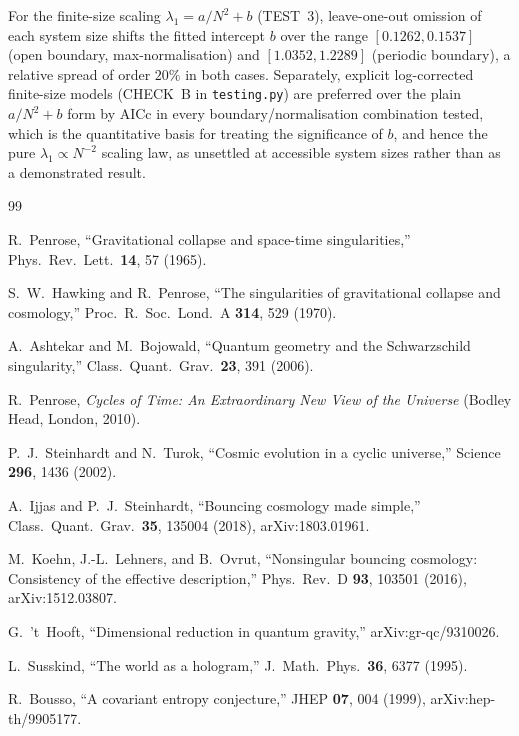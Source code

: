 \documentclass[reprint,superscriptaddress,amsmath,amssymb,aps,prd,showkeys,nofootinbib]{revtex4-2}
\begin{document}
For the finite-size scaling $\lambda_1=a/N^2+b$ (TEST~3), leave-one-out omission of each
system size shifts the fitted intercept $b$ over the range $[0.1262,0.1537]$ (open boundary,
max-normalisation) and $[1.0352,1.2289]$ (periodic boundary), a relative spread of order
$20\%$ in both cases. Separately, explicit log-corrected finite-size models (CHECK~B in
\texttt{testing.py}) are preferred over the plain $a/N^2+b$ form by AICc in every
boundary/normalisation combination tested, which is the quantitative basis for treating the
significance of $b$, and hence the pure $\lambda_1\propto N^{-2}$ scaling law, as unsettled
at accessible system sizes rather than as a demonstrated result.

\begin{thebibliography}{99}

R.~Penrose,
``Gravitational collapse and space-time singularities,''
Phys.\ Rev.\ Lett.\ \textbf{14}, 57 (1965).

S.~W.~Hawking and R.~Penrose,
``The singularities of gravitational collapse and cosmology,''
Proc.\ R.\ Soc.\ Lond.\ A \textbf{314}, 529 (1970).

A.~Ashtekar and M.~Bojowald,
``Quantum geometry and the Schwarzschild singularity,''
Class.\ Quant.\ Grav.\ \textbf{23}, 391 (2006).

R.~Penrose,
\textit{Cycles of Time: An Extraordinary New View of the Universe}
(Bodley Head, London, 2010).

P.~J.~Steinhardt and N.~Turok,
``Cosmic evolution in a cyclic universe,''
Science \textbf{296}, 1436 (2002).

A.~Ijjas and P.~J.~Steinhardt,
``Bouncing cosmology made simple,''
Class.\ Quant.\ Grav.\ \textbf{35}, 135004 (2018),
arXiv:1803.01961.

M.~Koehn, J.-L.~Lehners, and B.~Ovrut,
``Nonsingular bouncing cosmology: Consistency of the effective description,''
Phys.\ Rev.\ D \textbf{93}, 103501 (2016),
arXiv:1512.03807.

G.~'t~Hooft,
``Dimensional reduction in quantum gravity,''
arXiv:gr-qc/9310026.

L.~Susskind,
``The world as a hologram,''
J.\ Math.\ Phys.\ \textbf{36}, 6377 (1995).

R.~Bousso,
``A covariant entropy conjecture,''
JHEP \textbf{07}, 004 (1999),
arXiv:hep-th/9905177.


\end{thebibliography}
\end{document}
